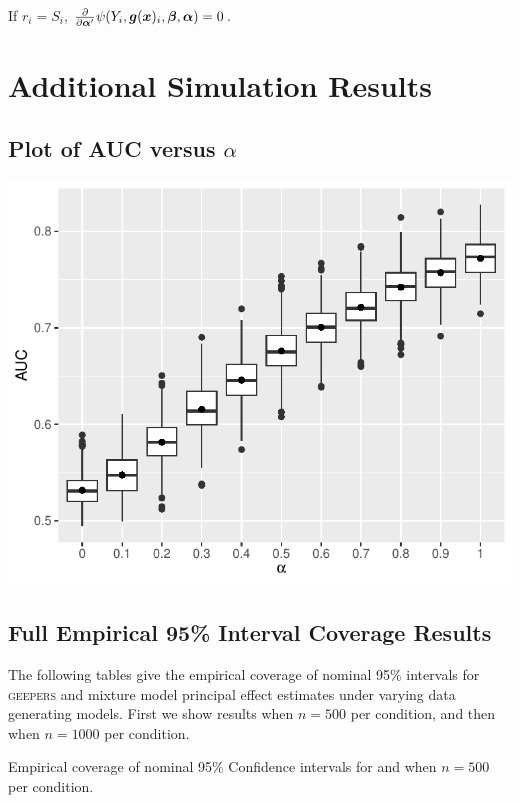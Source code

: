 \documentclass[]{article}
\begin{document}
If $r_i=S_i$, $\frac{\partial}{\partial \bm{\alpha}'}\psi(Y_i,\bm{g}(\bm{x})_i,\bm{\beta},\bm{\alpha})=0$.

  \FloatBarrier
\section{Additional Simulation Results}
\FloatBarrier
\subsection{Plot of  AUC versus $\alpha$}
\FloatBarrier

\begin{center}

    \includegraphics[width=5.5in]{simFigs/alphaAUC.pdf}

\end{center}

\FloatBarrier
\subsection{Full Empirical 95\% Interval Coverage Results}
\FloatBarrier

The following tables give the empirical coverage of nominal 95\% intervals for \textsc{geepers} and mixture model principal effect estimates under varying data generating models. First we show results when $n=500$ per condition, and then when $n=1000$ per condition. \\

\begin{table}
  \caption{Empirical coverage of nominal 95\% Confidence intervals for \geepers and \pmm when $n=500$ per condition.}
  
 \end{table}
\end{document}
